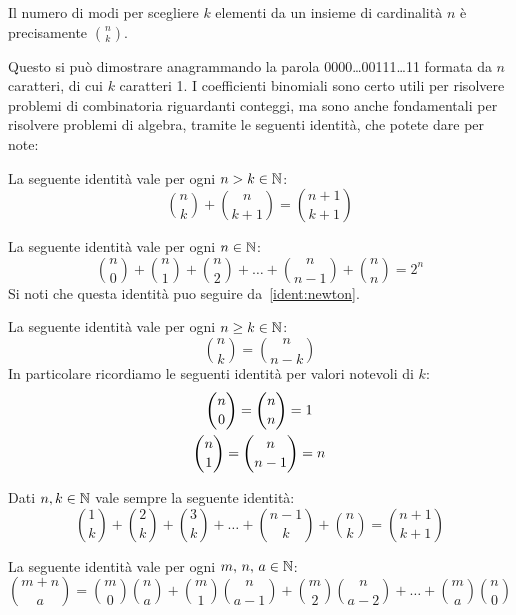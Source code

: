 \documentclass[11pt]{scrartcl}
\begin{document}
	\begin{lemma}
		\label{combinazioni}
		Il numero di modi per scegliere $k$ elementi da un insieme di cardinalità $n$ è precisamente
		$\binom{n}{k}$.
	\end{lemma}
	Questo si può dimostrare anagrammando la parola 0000\dots00111\dots11 formata da $n$ caratteri, di cui $k$ caratteri 1.
	I coefficienti binomiali sono certo utili per risolvere problemi di combinatoria riguardanti conteggi, ma sono anche fondamentali per risolvere problemi di algebra, tramite le seguenti identità, che potete dare per note:
	\begin{lemma}
		\label{binomial:identity:1}
		La seguente identità vale per ogni $n > k\in\mathbb N$:
		$$\binom{n}{k}+\binom{n}{k+1}=\binom{n+1}{k+1}$$
	\end{lemma}
	\begin{lemma}
		\label{binomial:identity:2}
		La seguente identità vale per ogni $n\in\mathbb N$:
		$$\binom{n}{0}+\binom{n}{1}+\binom{n}{2}+\dots+\binom{n}{n-1}+\binom{n}{n}=2^n$$
		Si noti che questa identità puo seguire da~\ref{ident:newton}.
	\end{lemma}
	\begin{lemma}
		\label{binomial:identity:3}
		La seguente identità vale per ogni $n\ge k \in \mathbb N$:
		$$\binom{n}{k}=\binom{n}{n-k}$$
		In particolare ricordiamo le seguenti identità per valori notevoli di $k$:
		\begin{gather}
			\notag \binom{n}{0}=\binom{n}{n}=1 \\
			\notag \binom{n}{1}=\binom{n}{n-1}=n
		\end{gather}
	\end{lemma}
	\begin{lemma}
		\label{binomial:identity:4}
		Dati $n,k \in \mathbb N$ vale sempre la seguente identità:
		$$\binom{1}{k}+\binom{2}{k}+\binom{3}{k}+\dots+\binom{n-1}{k}+\binom{n}{k}=\binom{n+1}{k+1}$$
	\end{lemma}
	\begin{lemma}[Vandermonde]
		\label{binomial:identity:5}
		La seguente identità vale per ogni $m,\,n,\,a \in \mathbb N$:
		$$\binom{m+n}{a}=\binom{m}{0}\binom{n}{a}+\binom{m}{1}\binom{n}{a-1}+\binom{m}{2}\binom{n}{a-2}+\dots+\binom{m}{a}\binom{n}{0}$$
	\end{lemma}
	
\end{document}
